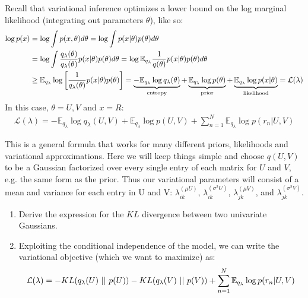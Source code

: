 \documentclass{harvardml}
\theoremstyle{plain}
\begin{document}
\begin{problem}

Recall that variational inference optimizes a lower bound on the log marginal likelihood (integrating out parameters $\theta$), like so:
\begin{align}
\log p(x) & = \log \int p(x, \theta) d\theta = \log \int p(x|\theta) p(\theta) d\theta \\
& = \log \int \frac{q_\lambda(\theta)}{q_\lambda(\theta)} p(x|\theta) p(\theta) d\theta
  = \log \mathbb{E}_{q_\lambda} \frac{1}{q(\theta)} p(x|\theta) p(\theta) d\theta \\
& \geq \mathbb{E}_{q_\lambda} \log \left[ \frac{1}{q_\lambda(\theta)} p(x|\theta) p(\theta) \right]
 = \underbrace{-\mathbb{E}_{q_\lambda} \log q_\lambda(\theta)}_{\textnormal{entropy}}  + \underbrace{\mathbb{E}_{q_\lambda} \log p(\theta)}_{\textnormal{prior}} + \underbrace{\mathbb{E}_{q_\lambda} \log p(x|\theta)}_{\textnormal{likelihood}}
= \mathcal{L}(\lambda)
\end{align}
%
In this case, $\theta = U,V$ and $x = R$:
%
\begin{align}
\mathcal{L}(\lambda) = -\mathbb{E}_{q_\lambda} \log q_\lambda(U, V) + \mathbb{E}_{q_\lambda} \log p(U, V) + \sum_{n=1}^N \mathbb{E}_{q_\lambda} \log p(r_n | U, V)
\end{align}
%

\noindent This is a general formula that works for many different priors, likelihoods and variational approximations. 
Here we will keep things simple and choose $q(U,V)$ to be a Gaussian factorized over every single entry of each matrix for $U$ and $V$, e.g. the same form as the prior.
Thus our variational parameters will consist of a mean and variance for each entry in U and V: $\lambda^{(\mu U)}_{ik}$, $\lambda^{(\sigma^2 U)}_{ik}$, $\lambda^{(\mu V)}_{jk}$, 
and $\lambda^{(\sigma^2 V)}_{jk}$.

\begin{enumerate}

\item Derive the expression for the $KL$ divergence between two univariate Gaussians.

\item Exploiting the conditional independence of the model, we can write the variational objective (which we want to maximize) as:
\[ {\cal L}(\lambda) = -KL(q_\lambda(U)\ ||\  p(U) ) - KL(q_\lambda(V)\ ||\ p(V)) + \sum_{n=1}^N \mathbb{E}_{q_\lambda} \log p(r_n | U, V)\]


\end{enumerate}
\end{problem}
\end{document}
